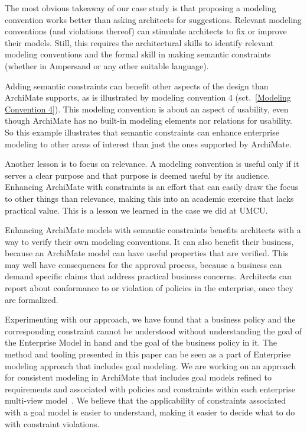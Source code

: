 \documentclass[sn-vancouver]{sn-jnl}%
\begin{document}
The most obvious takeaway of our case study is that proposing a modeling convention works better than asking architects for suggestions.
Relevant modeling conventions (and violations thereof) can stimulate architects to fix or improve their models.
Still, this requires the architectural skills to identify relevant modeling conventions and the formal skill in making semantic constraints
(whether in Ampersand or any other suitable language).

Adding semantic constraints can benefit other aspects of the design than ArchiMate supports,
as is illustrated by modeling convention 4 (sct.~\ref{Modeling Convention 4}).
This modeling convention is about an aspect of usability,
even though ArchiMate has no built-in modeling elements nor relations for usability.
So this example illustrates that semantic constraints can enhance enterprise modeling to other areas of interest than just the ones supported by ArchiMate.

Another lesson is to focus on relevance.
A modeling convention is useful only if it serves a clear purpose and that purpose is deemed useful by its audience.
Enhancing ArchiMate with constraints is an effort that can easily draw the focus to other things than relevance,
making this into an academic exercise that lacks practical value.
This is a lesson we learned in the case we did at UMCU.

Enhancing ArchiMate models with semantic constraints benefits architects with a way to verify their own modeling conventions.
It can also benefit their business, because an ArchiMate model can have useful properties that are verified.
This may well have consequences for the approval process, because a business can demand specific claims that address practical business concerns.
Architects can report about conformance to or violation of policies in the enterprise, once they are formalized.

Experimenting with our approach, we have found that a business policy and the corresponding constraint cannot be understood 
without understanding the goal of the Enterprise Model in hand and the goal of the business policy in it.
The method and tooling presented in this paper can be seen as a part of Enterprise modeling approach that includes goal modeling.
We are working on an approach for consistent modeling in ArchiMate that includes goal models 
refined to requirements and associated with policies and constraints within each enterprise multi-view model~\cite{severin2022}.
We believe that the applicability of constraints associated with a goal model is easier to understand,
making it easier to decide what to do with constraint violations.
\end{document}

